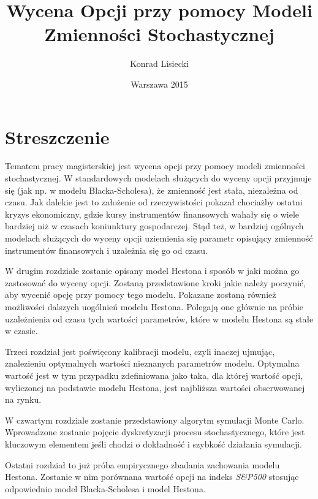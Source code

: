 \documentclass{pracamgr}
\author{Konrad Lisiecki}
\title{Wycena Opcji przy pomocy Modeli Zmienności Stochastycznej}
\date{Warszawa 2015}
\begin{document}
\maketitle

\cleardoublepage
{}
\chapter*{Streszczenie} 
 


Tematem pracy magisterskiej jest wycena opcji przy pomocy modeli zmienności stochastycznej. 
W standardowych modelach służących do wyceny opcji przyjmuje się (jak np. w modelu 
Blacka-Scholesa), że zmienność jest stała, niezależna od czasu. 
Jak dalekie jest to założenie od rzeczywistości pokazał chociażby ostatni kryzys 
ekonomiczny, gdzie kursy instrumentów finansowych wahały się o wiele bardziej niż w czasach
koniunktury gospodarczej. Stąd też, w bardziej ogólnych modelach służących do wyceny opcji uziemienia się parametr opisujący zmienność instrumentów finansowych i uzależnia się go od czasu. 

W drugim rozdziale zostanie opisany model Hestona i sposób w jaki można go zastosować do wyceny opcji. 
Zostaną przedstawione kroki jakie należy poczynić, aby wycenić opcję przy pomocy tego modelu.
Pokazane zostaną również możliwości dalszych uogólnień modelu Hestona. 
Polegają one głównie na próbie uzależnienia od czasu tych wartości parametrów, które w 
modelu Hestona są stałe w czasie.

Trzeci rozdział jest poświęcony kalibracji modelu, czyli inaczej ujmując, znalezieniu 
optymalnych wartości nieznanych parametrów modelu. Optymalna wartość jest w tym przypadku zdefiniowana
jako taka, dla której wartość opcji, wyliczonej na podstawie modelu Hestona, jest najbliższa wartości 
obserwowanej na rynku.

W czwartym rozdziale zostanie przedstawiony algorytm symulacji Monte Carlo. 
Wprowadzone zostanie pojęcie dyskretyzacji procesu stochastycznego, które jest kluczowym elementem
jeśli chodzi o dokładność i szybkość działania symulacji. 


Ostatni rozdział to już próba empirycznego zbadania zachowania modelu Hestona. Zostanie w nim porównana
wartość opcji na indeks \textit{S\&P500} stosując odpowiednio model Blacka-Scholesa i model Hestona.
\end{document}
